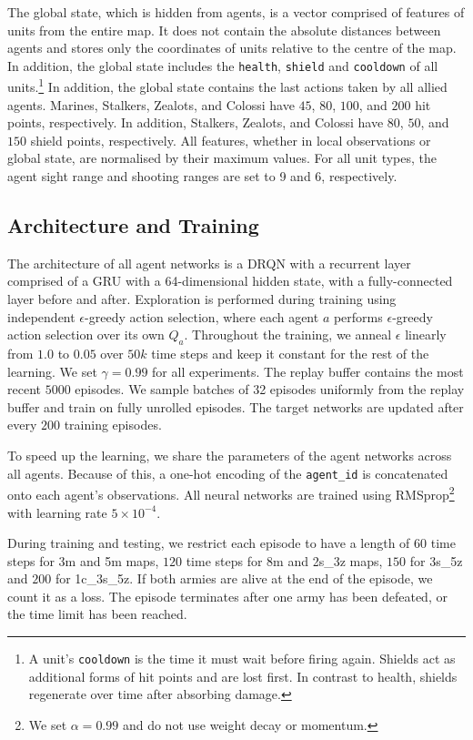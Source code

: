\documentclass{article}
\begin{document}
The global state, which is hidden from agents, is a vector comprised of features of units from the entire map. It does not contain the absolute distances between agents and stores only the coordinates of units relative to the centre of the map. In addition, the global state includes the \texttt{health}, \texttt{shield} and \texttt{cooldown} of all units.\footnote{A unit's \texttt{cooldown} is the time it must wait before firing again. Shields act as additional forms of hit points and are lost first. In contrast to health, shields regenerate over time after absorbing damage.} In addition, the global state contains the last actions taken by all allied agents. Marines, Stalkers, Zealots, and Colossi have $45$, $80$, $100$, and $200$ hit points, respectively. In addition, Stalkers, Zealots, and Colossi have $80$, $50$, and $150$ shield points, respectively. All features, whether in local observations or global state, are normalised by their maximum values. For all unit types, the agent sight range and shooting ranges are set to 9 and 6, respectively.


\subsection{Architecture and Training}

The architecture of all agent networks is a DRQN with a recurrent layer 
comprised of a GRU with a 64-dimensional hidden state, with a fully-connected 
layer before and after.
Exploration is performed during training using independent $\epsilon$-greedy action selection, where each agent $a$ performs $\epsilon$-greedy action selection over its own $Q_a$. 
Throughout the training, we anneal $\epsilon$ linearly from $1.0$ to $0.05$ over $50k$ time steps and keep it constant for the rest of the learning. 
We set $\gamma = 0.99$ for all experiments.
The replay buffer contains the most recent $5000$ episodes.  
We sample batches of 32 episodes uniformly from the replay buffer and train on fully unrolled episodes.
The target networks are updated after every $200$ training episodes.

To speed up the learning, we share the parameters of the agent networks across all agents. 
Because of this, a one-hot encoding of the \texttt{agent\_id} is concatenated onto each agent's observations. 
All neural networks are trained using RMSprop\footnote{We set $\alpha = 0.99$ and do not use weight decay or momentum.} with learning rate $5 \times 10^{-4}$. 

During training and testing, we restrict each episode to have a length of $60$ time steps for 3m and 5m maps, $120$ time steps for 8m and 2s\_3z maps, $150$ for 3s\_5z and $200$ for 1c\_3s\_5z. If both armies are alive at the end of the episode, we count it as a loss. The episode terminates after one army has been defeated, or the time limit has been reached. 
\end{document}
